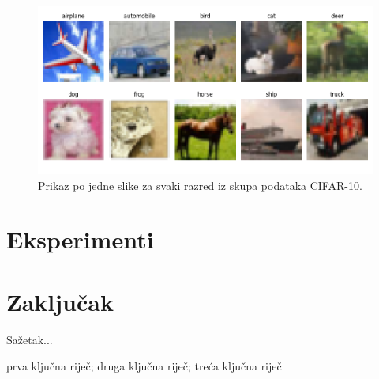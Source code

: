 \documentclass[diplomskirad]{fer}
\begin{document}
\begin{figure}[h]
  \centering
  \includegraphics[scale=0.6]{./Slike/cifar10.png}
  \caption{Prikaz po jedne slike za svaki razred iz skupa podataka CIFAR-10.}
  \label{fig:cifar10}
\end{figure}

\chapter{Eksperimenti}
\label{pog:eksperimenti}


\chapter{Zaključak}
\label{pog:zakljucak}







\begin{sazetak}
  Sažetak...
\end{sazetak}

\begin{kljucnerijeci}
  prva ključna riječ; druga ključna riječ; treća ključna riječ
\end{kljucnerijeci}
\end{document}
